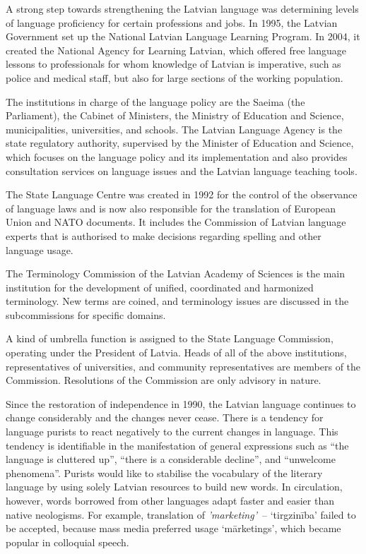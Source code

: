 \begin{multicols}{2}
A strong step towards strengthening the Latvian language was determining levels of language proficiency for certain professions and jobs.  In 1995, the Latvian Government set up the National Latvian Language Learning Program.  In 2004, it created the National Agency for Learning Latvian, which offered free language lessons to professionals for whom knowledge of Latvian is imperative, such as police and medical staff, but also for large sections of the working population.

The institutions in charge of the language policy are the Saeima (the Parliament), the Cabinet of Ministers, the Ministry of Education and Science, municipalities, universities, and schools.
The Latvian Language Agency is the state regulatory authority, supervised by the Minister of Education and Science, which focuses on the language policy and its implementation and also provides consultation services on language issues and the Latvian language teaching tools.

The State Language Centre was created in 1992 for the control of the observance of language laws and is now also responsible for the translation of European Union and NATO documents.
It includes the Commission of Latvian language experts that is authorised to make decisions regarding spelling and other language usage.

The Terminology Commission of the Latvian Academy of Sciences is the main institution for the development of unified, coordinated and harmonized terminology.
New terms are coined, and terminology issues are discussed in the subcommissions for specific domains.

A kind of umbrella function is assigned to the State Language Commission, operating under the President of Latvia.
Heads of all of the above institutions, representatives of universities, and community representatives are members of the Commission.
Resolutions of the Commission are only advisory in nature.

Since the restoration of independence in 1990, the Latvian language continues to change considerably and the changes never cease.
There is a tendency for language purists to react negatively to the current changes in language.
This tendency is identifiable in the manifestation of general expressions such as ``the language is cluttered up'', ``there is a considerable decline'', and ``unwelcome phenomena''.
Purists would like to stabilise the vocabulary of the literary language by using solely Latvian resources to build new words.
In circulation, however, words borrowed from other languages adapt faster and easier than native neologisms.
For example, translation of \textit{'marketing'}~-- `tirgzinība' failed to be accepted, because mass media preferred usage `mārketings', which became popular in colloquial speech.


\end{multicols}
